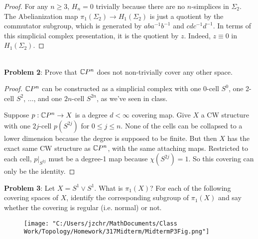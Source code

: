 \documentclass{amsart}
\begin{document}
\begin{proof}
		For any $n\geq 3$, $H_n=0$ trivially because there are no $n$-simplices in $\Sigma_2$.\\
		
		The Abelianization map $\pi_1(\Sigma_2)\to H_1(\Sigma_2)$ is just a quotient by the commutator subgroup, which is generated by $aba^{-1}b^{-1}$ and $cdc^{-1}d^{-1}$. In terms of this simplicial complex presentation, it is the quotient by $z$. Indeed, $z\equiv 0$ in $H_1(\Sigma_2)$. 
	\end{proof}\\
	
	\newpage
	\textbf{Problem 2}: Prove that $\mathbb{C} P^n$ does not non-trivially cover any other space.
	\begin{proof}
		$\mathbb{C} P^n$ can be constructed as a simplicial complex with one 0-cell $S^0$, one 2-cell $S^2$, $\dots$, and one $2n$-cell $S^{2n}$, as we've seen in class. 
%		

		Suppose $p:\mathbb{C} P^n\to X$ is a degree $d<\infty$ covering map. Give $X$ a CW structure with one $2j$-cell $p(S^{2j})$ for $0\leq j \leq n$. None of the cells can be collapsed to a lower dimension because the degree is supposed to be finite. But then $X$ has the exact same CW structure as $\mathbb{C} P^n$, with the same attaching maps. Restricted to each cell, $p|_{S^{2j}}$ must be a degree-1 map because $\chi(S^{2j})=1$. So this covering can only be the identity.
	\end{proof} 
	
	\newpage
	\textbf{Problem 3}: Let $X=S^1\vee S^1$. What is $\pi_1(X)$? For each of the following covering spaces of $X$, identify the corresponding subgroup of $\pi_1(X)$ and say whether the covering is regular (i.e. normal) or not.
	
	\begin{figure}[h]
		\texttt{[image: "C:/Users/jzchr/MathDocuments/Class Work/Topology/Homework/317Midterm/MidtermP3Fig.png"]}
	\end{figure}
	
\end{document}
